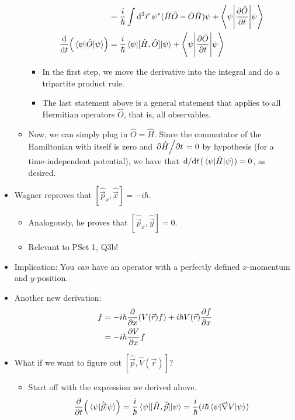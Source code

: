 \documentclass[../notes.tex]{subfiles}
\begin{document}
\begin{itemize}
\begin{itemize}
\begin{align*}
            &= \frac{i}{\hbar}\int\dd^3\vec{r}\ \psi^*(\hat{H}\hat{O}-\hat{O}\hat{H})\psi+\ev**{\pdv{\hat{O}}{t}}{\psi}\\
            \dv{t}(\ev{\hat{O}}{\psi}) &= \frac{i}{\hbar}\ev{[\hat{H},\hat{O}]}{\psi}+\ev**{\pdv{\hat{O}}{t}}{\psi}
        \end{align*}
        \begin{itemize}
            \item In the first step, we move the derivative into the integral and do a tripartite product rule.
            \item The last statement above is a general statement that applies to all Hermitian operators $\hat{O}$, that is, all observables.
        \end{itemize}
        \item Now, we can simply plug in $\hat{O}=\hat{H}$. Since the commutator of the Hamiltonian with itself is zero and $\pdv*{\hat{H}}{t}=0$ by hypothesis (for a time-independent potential), we have that ${\dv*{t}}(\ev{\hat{H}}{\psi})=0$, as desired.
    \end{itemize}
    \item Wagner reproves that $[\hat{\vec{p}}_x,\hat{\vec{x}}]=-i\hbar$.
    \begin{itemize}
        \item Analogously, he proves that $[\hat{\vec{p}}_x,\hat{\vec{y}}]=0$.
        \item Relevant to PSet 1, Q3b!
    \end{itemize}
    \item Implication: You \emph{can} have an operator with a perfectly defined $x$-momentum and $y$-position.
    \item Another new derivation:
    \begin{align*}
        [\hat{\vec{p}}_x,\hat{V}(\vec{r})]f &= -i\hbar\pdv{x}(V(\vec{r})f)+i\hbar V(\vec{r})\pdv{f}{x}\\
        &= -i\hbar\pdv{V}{x}f
    \end{align*}
    \item What if we want to figure out $[\hat{\vec{p}},\hat{V}(\vec{r})]$?
    \begin{itemize}
        \item Start off with the expression we derived above.
        \begin{equation*}
            \pdv{t}(\ev{\hat{\vec{p}}}{\psi}) = \frac{i}{\hbar}\ev{[\hat{H},\hat{\vec{p}}]}{\psi}
            = \frac{i}{\hbar}(i\hbar\ev{\vec{\nabla}V}{\psi})

\end{equation*}
\end{itemize}
\end{itemize}
\end{document}
